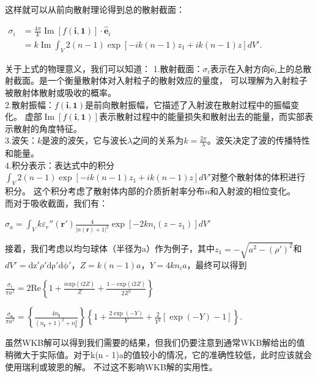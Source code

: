 \documentclass[12pt, a4paper, oneside]{ctexart}
\begin{document}
\begin{spacing}{2.0}
这样就可以从前向散射理论得到总的散射截面：
\begin{center}
    $\displaystyle \begin{aligned}\sigma_i&=\frac{4\pi}{k}\operatorname{Im}[f(\mathbf{i},\mathbf{1})]\cdot\hat{\mathbf{e}}_i\\ 
        &=k\operatorname{Im}\int_V2(n-1)\exp[-ik(n-1)z_1+ik(n-1)z]dV'.\end{aligned}$
\end{center}
关于上式的物理意义，我们可以知道：
1.散射截面：$\sigma_i$表示在入射方向$\hat{\mathbf{e}}_i$上的总散射截面。是一个衡量散射体对入射粒子的散射效应的量度，
可以理解为入射粒子被散射体散射或吸收的概率。
\\
2.散射振幅：$f(\mathbf{i},\mathbf{1})$是前向散射振幅，它描述了入射波在散射过程中的振幅变化。
虚部$\operatorname{Im}[f(\mathbf{i},\mathbf{1})]$表示散射过程中的能量损失和散射出去的能量，而实部表示散射的角度特征。
\\
3.波矢：$k$是波的波矢，它与波长$\lambda$之间的关系为$k=\frac{2\pi}{\lambda}$。波矢决定了波的传播特性和能量。
\\
4.积分表示：表达式中的积分$\int_V2(n-1)\exp[-ik(n-1)z_1+ik(n-1)z]dV'$对整个散射体的体积进行积分。
这个积分考虑了散射体内部的介质折射率分布$n$和入射波的相位变化。\\
而对于吸收截面，我们有：
\begin{center}
    $\displaystyle \sigma_a=\int_V k\varepsilon_r''(\mathbf{r'})\frac{4}{|n(\mathbf{r})+1|^2}\exp[-2kn_i(z-z_1)]dV'$
\end{center}
接着，我们考虑以均匀球体（半径为a）作为例子，其中$z_1 = -\sqrt{a^2-(\rho')^2}$和$dV' = \mathrm{dz'}\rho'\mathrm{d\rho'}\mathrm{d\phi'}$，$Z = k(n-1)a$，$Y = 4kn_ia$，最终可以得到
\begin{center}
    $\displaystyle \frac{\sigma_t}{\pi a^2}=2\text{Re}\left\{1+\frac{i\text{exp}(i2Z)}{Z}+\frac{1-\text{exp}(i2Z)}{2Z^2}\right\}$
\end{center}

\begin{center}
    $\displaystyle\frac{\sigma_\mathbf a}{\pi a^2}=\left\{\frac{4n_\mathbf t}{(n_\mathbf r+1)^2+n_\mathbf i^2}\right\}\left\{1+\frac{2\exp(-Y)}{Y}+\frac{2}{Y^2}\left[\exp(-Y)-1\right]\right\}.$
\end{center}

虽然WKB解可以得到我们需要的结果，但我们仍要注意到通常WKB解给出的值稍微大于实际值\cite{5472149}。对于k(n - 1)a的值较小的情况，它的准确性较低，此时应该就会使用瑞利或玻恩的解。
不过这不影响WKB解的实用性。



\end{spacing}
\end{document}
